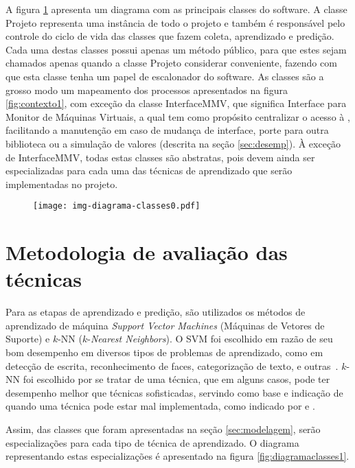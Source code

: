 
A figura \ref{fig:diagramaclasses0} apresenta um diagrama com as
principais classes do software. A classe Projeto representa uma
instância de todo o projeto e também é responsável pelo controle do ciclo
de vida das classes que fazem coleta, aprendizado e predição. Cada uma
destas classes possui apenas um método público, para que estes sejam
chamados apenas quando a classe Projeto considerar conveniente,
fazendo com que esta classe tenha um papel de escalonador do
software. As classes são a grosso modo um mapeamento dos processos
apresentados na figura \ref{fig:contexto1}, com exceção da classe
InterfaceMMV, que significa Interface para Monitor de
Máquinas Virtuais, a qual tem como propósito centralizar o acesso à \libvirt{},
facilitando a manutenção em caso de mudança de interface, porte para outra
biblioteca ou a simulação de valores (descrita na seção
\ref{sec:desemp}). À exceção de InterfaceMMV, todas estas
classes são abstratas, pois devem ainda ser especializadas para cada uma
das técnicas de aprendizado que serão implementadas no projeto.

\begin{figure}[htp]
\centering
\texttt{[image: img-diagrama-classes0.pdf]}
\label{fig:diagramaclasses0}
\end{figure}


\section{Metodologia de avaliação das técnicas}

Para as etapas de aprendizado e predição, são utilizados os métodos de
aprendizado de máquina \emph{Support Vector Machines} (Máquinas de Vetores
de Suporte) e $k$-NN ($k$-\emph{Nearest Neighbors}). O SVM foi escolhido em
razão de seu bom desempenho em diversos tipos de problemas de aprendizado,
como em detecção de escrita, reconhecimento de faces, categorização de
texto, e outras~\cite{bennett2000support}. $k$-NN foi escolhido por se
tratar de uma técnica, que em alguns casos, pode ter desempenho melhor que
técnicas sofisticadas, servindo como base e indicação de quando uma técnica
pode estar mal implementada, como indicado por
 e .

Assim, das classes que foram apresentadas na seção \ref{sec:modelagem},
serão especializações para cada tipo de técnica de aprendizado. O diagrama
representando estas especializações é apresentado na figura
\ref{fig:diagramaclasses1}.

